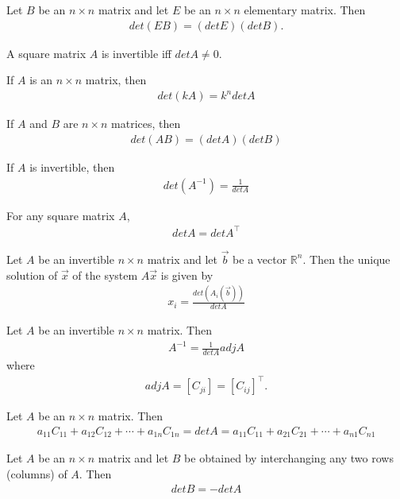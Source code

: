 \documentclass{article}
\begin{document}
\begin{theorem}
    Let $B$ be an $n\times n$ matrix and let $E$ be an $n\times n$ elementary matrix. Then
    \begin{align*}
        det(EB) = (det E)(det B).
    \end{align*}
\end{theorem}
\begin{theorem}
    A square matrix $A$ is invertible iff $det A \not= 0$.
\end{theorem}
\begin{theorem}
    If $A$ is an $n\times n$ matrix, then
    \begin{align*}
        det(kA) = k^n det A
    \end{align*}
\end{theorem}
\begin{theorem}
    If $A$ and $B$ are $n\times n$ matrices, then
    \begin{align*}
        det(AB) = (det A)(det B)
    \end{align*}
\end{theorem}
\begin{theorem}
    If $A$ is invertible, then
    \begin{align*}
        det(A^{-1})=\frac{1}{det A}
    \end{align*}
\end{theorem}
\begin{theorem}
    For any square matrix $A$,
    \begin{align*}
        det A = det A^\intercal
    \end{align*}
\end{theorem}
\begin{theorem}
    Let $A$ be an invertible $n\times n$ matrix and let $\vec b$ be a vector $\mathbb{R}^n$. Then the unique solution of $\vec x$ of the system $A\vec x$ is given by
    \begin{align*}
        x_i = \frac{det(A_i(\vec b))}{det A}
    \end{align*}
\end{theorem}
\begin{theorem}
    Let $A$ be an invertible $n\times n$ matrix. Then
    \begin{align*}
        A^{-1}=\frac{1}{det A}adj A
    \end{align*}
    where
    \begin{align*}
        adj A = [C_{ji}] = [C_{ij}]^\intercal.
    \end{align*}
\end{theorem}
\begin{theorem}
    Let $A$ be an $n\times n$ matrix. Then
    \begin{align*}
        a_{11}C_{11}+a_{12}C_{12}+\cdots+a_{1n}C_{1n}= det A = a_{11}C_{11}+a_{21}C_{21} + \cdots + a_{n1}C_{n1}
    \end{align*}
\end{theorem}
\begin{theorem}
    Let $A$ be an $n\times n$ matrix and let $B$ be obtained by interchanging any two rows (columns) of $A$. Then
    \begin{align*}
        det B = - det A
    \end{align*}
\end{theorem}
\end{document}
